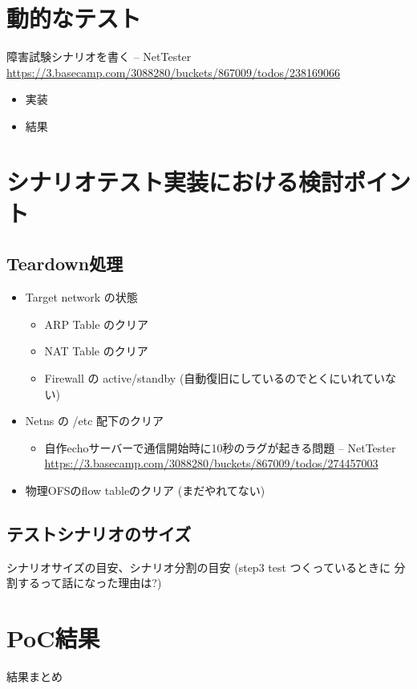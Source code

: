 \section{動的なテスト}

障害試験シナリオを書く – NetTester \url{https://3.basecamp.com/3088280/buckets/867009/todos/238169066}

\begin{itemize}
 \item 実装
 \item 結果
\end{itemize}

\section{シナリオテスト実装における検討ポイント}

\subsection{Teardown処理}

\begin{itemize}
 \item Target network の状態
       \begin{itemize}
        \item ARP Table のクリア
        \item NAT Table のクリア
        \item Firewall の active/standby (自動復旧にしているのでとくにいれていない)
       \end{itemize}
 \item Netns の /etc 配下のクリア
       \begin{itemize}
        \item 自作echoサーバーで通信開始時に10秒のラグが起きる問題 – NetTester \url{https://3.basecamp.com/3088280/buckets/867009/todos/274457003}
       \end{itemize}
 \item 物理OFSのflow tableのクリア (まだやれてない)
\end{itemize}

\subsection{テストシナリオのサイズ}

シナリオサイズの目安、シナリオ分割の目安 (step3 test つくっているときに
分割するって話になった理由は?)

\section{PoC結果}

結果まとめ

